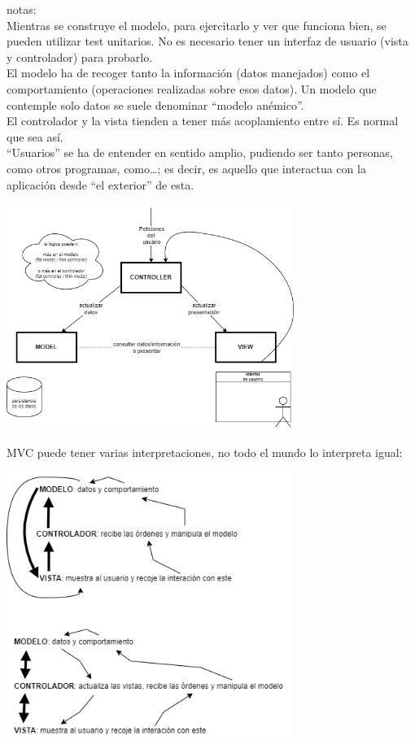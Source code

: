 \documentclass[spanish,12pt,a4paper,final,oneside]{book}
\begin{document}
\begin{footnotesize}
notas:
\\Mientras se construye el modelo, para ejercitarlo y ver que funciona bien, se pueden utilizar test unitarios. No es necesario tener un interfaz de usuario (vista y controlador) para probarlo.
\\El modelo ha de recoger tanto la información (datos manejados) como el comportamiento (operaciones realizadas sobre esos datos). Un modelo que contemple solo datos se suele denominar ``modelo anémico''.
\\El controlador y la vista tienden a tener más acoplamiento entre sí. Es normal que sea así.
\\``Usuarios'' se ha de entender en sentido amplio, pudiendo ser tanto personas, como otros programas, como\ldots; es decir, es aquello que interactua con la aplicación desde ``el exterior'' de esta.
\end{footnotesize}

\begin{center}\includegraphics[width=0.7\textwidth]{division en capas - MVC}\end{center}

MVC puede tener varias interpretaciones, no todo el mundo lo interpreta igual:
\begin{center}\includegraphics[width=0.7\textwidth]{division en capas - MVC - distintas interpretaciones}\end{center}
\end{document}

